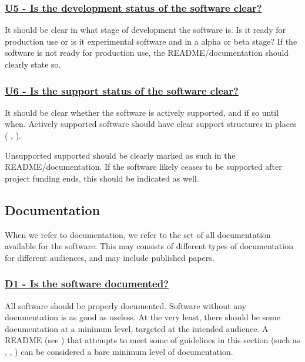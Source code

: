 \documentclass[a4paper,11pt]{article}
\newcommand{\criterion}[2]{\subsubsection*{\underline{#1 - #2}}\label{id:#1}}
\newcommand\CheckTable{%
  \begin{tabular}{ccccc}
    No & Minimal & Adequate & Good & Perfect \\
    0 & 1 & 2 & 3 & 4 \\
    \hline
    $\square$ & $\square$ & $\square$ & $\square$ & $\square$ \\
  \end{tabular}%
}
\newcommand{\refcrit}[1]{%
 \framebox[1.1\width]{\hyperref[id:#1]{#1}}
}
\begin{document}
\newcommand{\uFiveID}{U5}
\newcommand{\uFiveText}{Is the development status of the software clear?}
\criterion{\uFiveID}{\uFiveText}

It should be clear in what stage of development the software is. Is it ready for
production use or is it experimental software and in a alpha or beta stage? If
the software is not ready for production use, the README/documentation should clearly state
so.

\newcommand{\uSixID}{U6}
\newcommand{\uSixText}{Is the support status of the software clear?}
\criterion{\uSixID}{\uSixText}

It should be clear whether the software is actively supported, and if so until
when. Actively supported software should have clear support structures in
places (\refcrit{SP1}, \refcrit{SP2}).

Unsupported supported should be clearly marked as such in the
README/documentation. If the software likely ceases to be supported after project
funding ends, this should be indicated as well.


\subsection{Documentation}\label{sec:doc}

When we refer to documentation, we refer to the set of all documentation
available for the software. This may consists of different types of
documentation for different audiences, and may include published papers.

\newcommand{\dOneID}{D1}
\newcommand{\dOneText}{Is the software documented?}
\criterion{\dOneID}{\dOneText}

All software should be properly documented. Software without any documentation
is as good as useless. At the very least, there should be some documentation at
a minimum level, targeted at the intended audience. A README (see \refcrit{IS7}) that
attempts to meet some of guidelines in this section (such as
\refcrit{D6},\refcrit{D8},\refcrit{D9}) can be
considered a bare minimum level of documentation.


%
%
%
\end{document}
